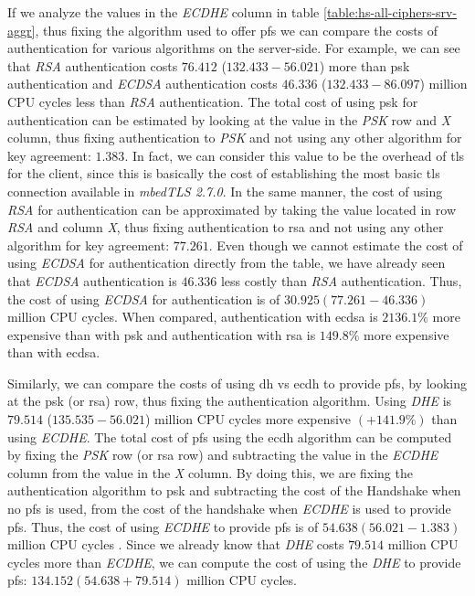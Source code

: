 \documentclass{llncs}
\begin{document}
If we analyze the values in the \textit{ECDHE} column in table \ref{table:hs-all-ciphers-srv-aggr}, thus fixing the
algorithm used to offer \gls{pfs} we can compare the costs of authentication for various algorithms on the server-side.
For example, we can see that \textit{RSA} authentication costs $76.412$ ($132.433-56.021$) more than \gls{psk}
authentication and \textit{ECDSA} authentication costs $46.336$ ($132.433-86.097$) million CPU cycles less
than \textit{RSA} authentication. The total cost of using \gls{psk} for authentication can be estimated
by looking at the
value in the \textit{PSK} row and \textit{X} column, thus fixing authentication to \textit{PSK} and not using any other
algorithm for key agreement: $1.383$. In fact, we can consider this value to be the overhead of \gls{tls} for the client,
since this is basically the cost of establishing the most basic \gls{tls} connection available in \textit{mbedTLS 2.7.0}.
In the same manner, the cost of using \textit{RSA} for authentication can
be approximated by taking the value located in row \textit{RSA} and column \textit{X}, thus fixing authentication
to \gls{rsa} and not using any other algorithm for key agreement: $77.261$. Even though we cannot estimate the cost
of using \textit{ECDSA} for authentication directly from the table, we have already seen that \textit{ECDSA} authentication
is $46.336$ less costly than \textit{RSA} authentication. Thus, the cost of using \textit{ECDSA} for authentication
is of $30.925 (77.261-46.336)$ million CPU cycles. When compared, authentication with \gls{ecdsa} is
$2136.1\%$ more expensive than with \gls{psk} and authentication with \gls{rsa} is $149.8\%$ more expensive
than with \gls{ecdsa}.

Similarly, we can compare the costs of using \gls{dh} vs \gls{ecdh} to provide \gls{pfs}, by
looking at the \gls{psk} (or \gls{rsa}) row, thus fixing the authentication algorithm. Using \textit{DHE} is
$79.514$ ($135.535 - 56.021$) million CPU cycles more expensive $(+141.9\%)$ than using \textit{ECDHE}. The total cost of \gls{pfs}
using the \gls{ecdh} algorithm can be computed by fixing the \textit{PSK} row (or \gls{rsa} row)
and subtracting the value in the \textit{ECDHE} column from the value in the \textit{X} column. By doing this, we are
fixing the authentication algorithm to \gls{psk} and subtracting the cost of the Handshake when no \gls{pfs} is used,
from the cost of the handshake when \textit{ECDHE} is used to provide \gls{pfs}. Thus, the cost of using \textit{ECDHE}
to provide \gls{pfs} is of $54.638 (56.021-1.383)$ million CPU cycles . Since we already know that \textit{DHE} costs
$79.514$ million CPU cycles more than \textit{ECDHE}, we can compute the cost of using the \textit{DHE} to
provide \gls{pfs}: $134.152 (54.638+79.514)$ million CPU cycles.
\end{document}
